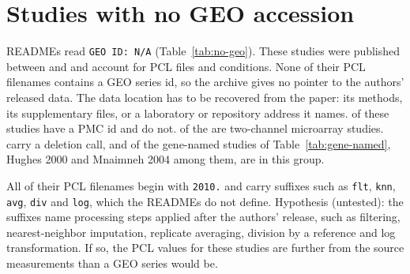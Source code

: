 
\section{Studies with no GEO accession}\label{sec:no-geo}

\spellNNoGeo{} READMEs read \texttt{GEO ID: N/A} (Table~\ref{tab:no-geo}). These
studies were published between \spellNoGeoYearMin{} and \spellNoGeoYearMax{} and
account for \spellNNoGeoDatasets{} PCL files and \spellNNoGeoConditions{}
conditions. None of their PCL filenames contains a GEO series id, so the archive
gives no pointer to the authors' released data. The data location has to be
recovered from the paper: its methods, its supplementary files, or a laboratory
or repository address it names. \spellNNoGeoPmc{} of these studies have a PMC id
and \spellNNoGeoNoPmc{} do not. \spellNNoGeoTwoChannel{} of the \spellNNoGeo{}
are two-channel microarray studies. \spellNKoStudiesNoGeo{} carry a deletion
call, and \spellNNamedStudiesNoGeo{} of the \spellNNamedStudies{} gene-named
studies of Table~\ref{tab:gene-named}, Hughes 2000 and Mnaimneh 2004 among them,
are in this group.

All \spellNNoGeoPclPrefixed{} of their PCL filenames begin with \texttt{2010.}
and carry suffixes such as \texttt{flt}, \texttt{knn}, \texttt{avg},
\texttt{div} and \texttt{log}, which the READMEs do not define. Hypothesis
(untested): the suffixes name processing steps applied after the authors'
release, such as filtering, nearest-neighbor imputation, replicate averaging,
division by a reference and log transformation. If so, the PCL values for these
studies are further from the source measurements than a GEO series would be.


